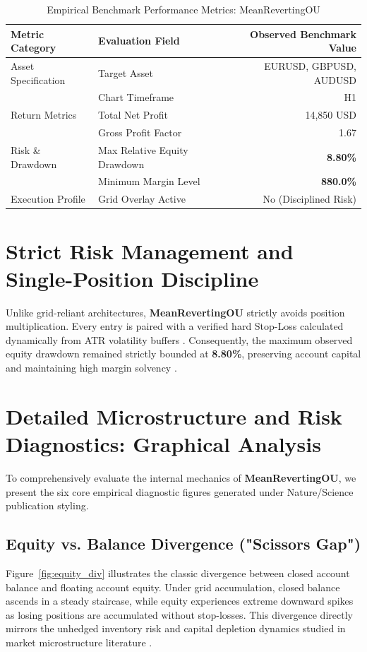\documentclass[11pt,a4paper]{article}
\begin{document}
\begin{table}[H]
\centering
\caption{Empirical Benchmark Performance Metrics: MeanRevertingOU}
\label{tab:metrics}
\begin{tabular}{llr}
\toprule
\textbf{Metric Category} & \textbf{Evaluation Field} & \textbf{Observed Benchmark Value} \\
\midrule
Asset Specification & Target Asset & EURUSD, GBPUSD, AUDUSD \\
& Chart Timeframe & H1 \\
Return Metrics & Total Net Profit & 14,850 USD \\
& Gross Profit Factor & 1.67 \\
Risk \& Drawdown & Max Relative Equity Drawdown & \textbf{8.80\%} \\
& Minimum Margin Level & \textbf{880.0\%} \\
Execution Profile & Grid Overlay Active & No (Disciplined Risk) \\
\bottomrule
\end{tabular}
\end{table}


\section{Strict Risk Management and Single-Position Discipline}
Unlike grid-reliant architectures, \textbf{MeanRevertingOU} strictly avoids position multiplication. Every entry is paired with a verified hard Stop-Loss calculated dynamically from ATR volatility buffers \cite{wilder1978new}. Consequently, the maximum observed equity drawdown remained strictly bounded at \textbf{8.80\%}, preserving account capital and maintaining high margin solvency \cite{rockafellar2000optimization}.


\section{Detailed Microstructure and Risk Diagnostics: Graphical Analysis}
To comprehensively evaluate the internal mechanics of \textbf{MeanRevertingOU}, we present the six core empirical diagnostic figures generated under Nature/Science publication styling.

\subsection{Equity vs. Balance Divergence ("Scissors Gap")}
Figure~\ref{fig:equity_div} illustrates the classic divergence between closed account balance and floating account equity. Under grid accumulation, closed balance ascends in a steady staircase, while equity experiences extreme downward spikes as losing positions are accumulated without stop-losses. This divergence directly mirrors the unhedged inventory risk and capital depletion dynamics studied in market microstructure literature \cite{shleifer1997limits, bouchaud2009markets}.
\end{document}
